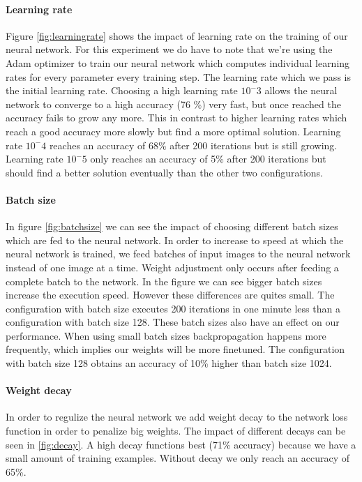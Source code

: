 \documentclass{article}
\begin{document}
\paragraph{Learning rate}
Figure \ref{fig:learningrate} shows the impact of learning rate on the training of our neural network. 
For this experiment we do have to note that we're using the Adam optimizer to train our neural network which computes individual learning rates for every parameter every training step. The learning rate which we pass is the initial learning rate. Choosing a high learning rate $10^-3$ allows the neural network to converge to a high accuracy (76 \%) very fast, but once reached the accuracy fails to grow any more.
This in contrast to higher learning rates which reach a good accuracy more slowly but find a more optimal solution. Learning rate $10^-4$ reaches an accuracy of 68\% after 200 iterations but is still growing. Learning rate $10^-5$ only reaches an accuracy of 5\% after 200 iterations but should find a better solution eventually than the other two configurations. 
\paragraph{Batch size}
In figure \ref{fig:batchsize} we can see the impact of choosing different batch sizes which are fed to the neural network. In order to increase to speed at which the neural network is trained, we feed batches of input images to the neural network instead of one image at a time. 
Weight adjustment only occurs after feeding a complete batch to the network. In the figure we can see bigger batch sizes increase the execution speed. However these differences are quites small. The configuration with batch size executes 200 iterations in one minute less than a configuration with batch size 128. These batch sizes also have an effect on our performance. When using small batch sizes backpropagation happens more frequently, which implies our weights will be more finetuned. The configuration with batch size 128 obtains an accuracy of 10\% higher than batch size 1024.
\paragraph{Weight decay}
In order to regulize the neural network we add weight decay to the network loss function in order to penalize big weights. The impact of different decays can be seen in \ref{fig:decay}. A high decay functions best (71\% accuracy) because we have a small amount of training examples. Without decay we only reach an accuracy of 65\%. 
\end{document}
